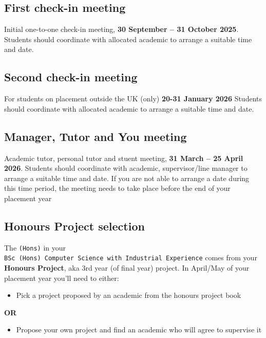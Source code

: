 \documentclass[
]{book}
\providecommand{\tightlist}{%
  \setlength{\itemsep}{0pt}\setlength{\parskip}{0pt}}
\begin{document}
\subsection{First check-in meeting}\label{one}

Initial one-to-one check-in meeting, \textbf{30 September -- 31 October 2025}. Students should coordinate with allocated academic to arrange a suitable time and date.

\subsection{Second check-in meeting}\label{two}

For students on placement outside the UK (only) \textbf{20-31 January 2026} Students should coordinate with allocated academic to arrange a suitable time and date.

\subsection{Manager, Tutor and You meeting}\label{three}

Academic tutor, personal tutor and stuent meeting, \textbf{31 March -- 25 April 2026}. Students should coordinate with academic, supervisor/line manager to arrange a suitable time and date. If you are not able to arrange a date during this time period, the meeting needs to take place before the end of your placement year

\subsection{Honours Project selection}\label{four}

The \texttt{(Hons)} in your \texttt{BSc\ (Hons)\ Computer\ Science\ with\ Industrial\ Experience} comes from your \textbf{Honours Project}, aka 3rd year (of final year) project. In April/May of your placement year you'll need to either:

\begin{itemize}
\tightlist
\item
  Pick a project proposed by an academic from the honours project book
\end{itemize}

\textbf{OR}

\begin{itemize}
\tightlist
\item
  Propose your own project and find an academic who will agree to supervise it
\end{itemize}
\end{document}
